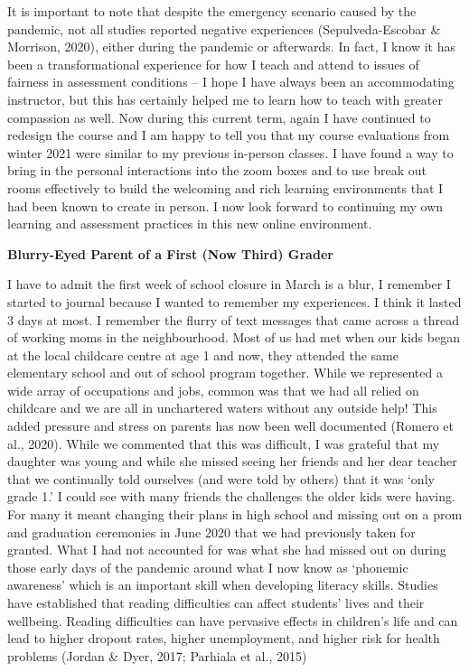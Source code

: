 \documentclass[
]{book}
\begin{document}
It is important to note that despite the emergency scenario caused by the pandemic, not all studies reported negative experiences (Sepulveda-Escobar \& Morrison, 2020), either during the pandemic or afterwards. In fact, I know it has been a transformational experience for how I teach and attend to issues of fairness in assessment conditions -- I hope I have always been an accommodating instructor, but this has certainly helped me to learn how to teach with greater compassion as well. Now during this current term, again I have continued to redesign the course and I am happy to tell you that my course evaluations from winter 2021 were similar to my previous in-person classes. I have found a way to bring in the personal interactions into the zoom boxes and to use break out rooms effectively to build the welcoming and rich learning environments that I had been known to create in person. I now look forward to continuing my own learning and assessment practices in this new online environment.

\textbf{Blurry-Eyed Parent of a First (Now Third) Grader}

I have to admit the first week of school closure in March is a blur, I remember I started to journal because I wanted to remember my experiences. I think it lasted 3 days at most. I remember the flurry of text messages that came across a thread of working moms in the neighbourhood. Most of us had met when our kids began at the local childcare centre at age 1 and now, they attended the same elementary school and out of school program together. While we represented a wide array of occupations and jobs, common was that we had all relied on childcare and we are all in unchartered waters without any outside help! This added pressure and stress on parents has now been well documented (Romero et al., 2020). While we commented that this was difficult, I was grateful that my daughter was young and while she missed seeing her friends and her dear teacher that we continually told ourselves (and were told by others) that it was `only grade 1.' I could see with many friends the challenges the older kids were having. For many it meant changing their plans in high school and missing out on a prom and graduation ceremonies in June 2020 that we had previously taken for granted. What I had not accounted for was what she had missed out on during those early days of the pandemic around what I now know as `phonemic awareness' which is an important skill when developing literacy skills. Studies have established that reading difficulties can affect students' lives and their wellbeing. Reading difficulties can have pervasive effects in children's life and can lead to higher dropout rates, higher unemployment, and higher risk for health problems (Jordan \& Dyer, 2017; Parhiala et al., 2015)
\end{document}
